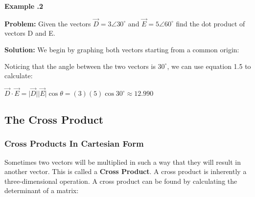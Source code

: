 	
		\begin{mdframed}[backgroundcolor=blue!10!white]
		\begin{center}
			\textbf{Example \thesubsection.2}	\label{example:dotproduct2}
			\vspace{0.1in}
			
			
		\end{center}
		
		\textbf{Problem:} Given the vectors $ \vec{D} = 3 \angle 30^{\circ} $ and $\vec{E} = 5 \angle 60^{\circ}$ find the dot product of vectors D and E. 
		
		\vspace{.1in}
		
		\textbf{Solution:}  We begin by graphing both vectors starting from a common origin:
		\begin{center}
			

		\end{center}
			
			Noticing that the angle between the two vectors is $30^\circ$, we can use equation 1.5 to calculate:
			
			\begin{center}
				$ 		\vec{D} \cdot \vec{E} = \lvert \vec{D} \rvert  \lvert \vec{E} \rvert \cos{\theta} = (3)(5)\cos30^\circ \approx \boxed{12.990} $
			\end{center}
		
		
		
		
		\begin{center}
			
		\end{center}
		
		
	\end{mdframed}
	
	
	
	\subsection{The Cross Product}   
	\subsubsection{Cross Products In Cartesian Form}
	Sometimes two vectors will be multiplied in such a way that they will result in another vector.  This is called a \textbf{Cross Product}.  A cross product is inherently a three-dimensional operation.  A cross product can be found by calculating the determinant of a matrix:  
	
